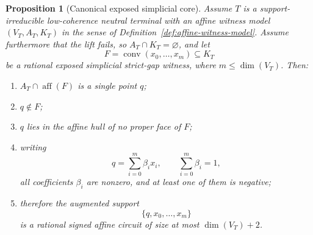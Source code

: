\documentclass[11pt]{article}
\newtheorem{proposition}[theorem]{Proposition}
\theoremstyle{definition}
\newcommand{\1}{\mathbf{1}}
\begin{document}
\begin{proposition}[Canonical exposed simplicial core]\label{prop:canonical-exposed-core}
Assume $T$ is a support-irreducible low-coherence neutral terminal with an affine witness model $(V_T,A_T,K_T)$ in the sense of Definition~\ref{def:affine-witness-model}.
Assume furthermore that the lift fails, so $A_T\cap K_T=\varnothing$, and let
\[
F=\operatorname{conv}(x_0,\dots,x_m)\subseteq K_T
\]
be a rational exposed simplicial strict-gap witness, where $m\le \dim(V_T)$.
Then:
\begin{enumerate}[label=(\roman*),leftmargin=2.2em]
\item $A_T\cap \operatorname{aff}(F)$ is a single point $q$;
\item $q\notin F$;
\item $q$ lies in the affine hull of no proper face of $F$;
\item writing
\[
q=\sum_{i=0}^m \beta_i x_i,
\qquad
\sum_{i=0}^m \beta_i=1,
\]
all coefficients $\beta_i$ are nonzero, and at least one of them is negative;
\item therefore the augmented support
\[
\{q,x_0,\dots,x_m\}
\]
is a rational signed affine circuit of size at most $\dim(V_T)+2$.
\end{enumerate}
\end{proposition}
\end{document}
